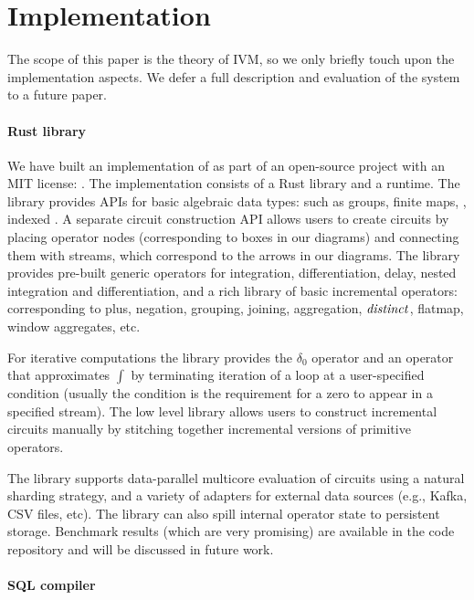 \section{Implementation}\label{sec:implementation}

The scope of this paper is the \dbsp theory of IVM, so we only briefly touch upon
the implementation aspects.  We defer a full description and evaluation of the
system to a future paper.

\paragraph{\dbsp Rust library}

We have built an implementation of \dbsp as part of an
open-source project with an MIT license:
.
The implementation consists of a Rust library and a runtime.
The library provides APIs for basic algebraic data types:
such as groups, finite maps, \zr, indexed \zr.
A separate circuit construction API allows users to
create \dbsp circuits by placing operator nodes (corresponding to boxes in our diagrams)
and connecting them with streams, which correspond to the
arrows in our diagrams.  The library provides pre-built generic operators
for integration, differentiation, delay, nested integration and differentiation,
and a rich library of \zr basic incremental operators:
corresponding to plus, negation, grouping, joining, aggregation, $\mathit{distinct}$,
flatmap, window aggregates, etc.

For iterative computations the library provides the $\delta_0$ operator and
an operator that approximates $\int$ by terminating iteration of
a loop at a user-specified condition (usually the condition is the
requirement for a zero to appear in a specified stream).
The low level library allows users to construct incremental
circuits manually by stitching together incremental versions of primitive operators.

The library supports data-parallel multicore evaluation of circuits
using a natural sharding strategy, and a variety of adapters for
external data sources (e.g., Kafka, CSV files, etc).  The library can
also spill internal operator state to persistent storage.  Benchmark
results (which are very promising) are available in the code
repository and will be discussed in future work.

\paragraph{SQL compiler}

